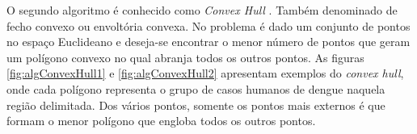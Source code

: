 O segundo algoritmo é conhecido como {\em Convex Hull} \cite{ConvexHull}. Também denominado de fecho convexo ou envoltória convexa. No problema é dado um conjunto de pontos no espaço Euclideano e deseja-se encontrar o menor número de pontos que geram um polígono convexo no qual abranja todos os outros pontos.
As figuras \ref{fig:algConvexHull1} e \ref{fig:algConvexHull2} apresentam exemplos do \emph{convex hull}, onde cada polígono representa o grupo de casos humanos de dengue naquela região delimitada. Dos vários pontos, somente os pontos mais externos é que formam o menor polígono que engloba todos os outros pontos.
%
\begin{figure}[!ht]
	\centering	
\end{figure}
\FloatBarrier
\begin{figure}[!ht]
	\centering	
\end{figure}
\FloatBarrier

